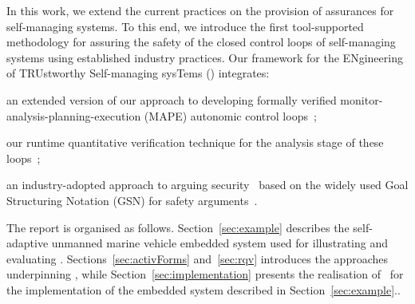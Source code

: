 In this work, we extend the current practices on the provision of assurances for self-managing systems. To this end, we introduce the first tool-supported methodology for assuring the safety of the closed control loops of self-managing systems using established industry practices. Our framework for the ENgineering of TRUstworthy Self-managing sysTems (\approach) integrates:
\squishlist
	\item an extended version of our approach to developing formally verified monitor-analysis-planning-execution (MAPE) autonomic control loops~\cite{Iftikhar2014:SEAMS};
	\item our runtime quantitative verification technique for the analysis stage of these loops~\cite{Calinescu2012:CACM};
	\item an industry-adopted approach to arguing security~\cite{Weinstock2007} based on the widely used Goal Structuring Notation (GSN) for safety arguments~\cite{Kelly2004:DSN}.
\squishend

The report is organised as follows.  Section~\ref{sec:example} describes the self-adaptive unmanned marine vehicle embedded system used for illustrating and evaluating \approach. Sections~\ref{sec:activForms} and~\ref{sec:rqv} introduces the approaches underpinning \approach, while Section~\ref{sec:implementation} presents the realisation of \approach\ for the implementation of the embedded system described in Section~\ref{sec:example}..

